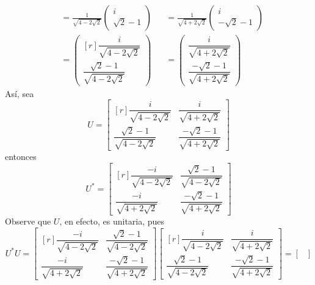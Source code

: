 \begin{example}
\begin{align*}
        & = \frac{1}{\sqrt{4 - 2\sqrt{2}}} \begin{pmatrix} i \\ \sqrt{2} - 1 \end{pmatrix} & & = \frac{1}{\sqrt{4 + 2\sqrt{2}}} \begin{pmatrix} i \\ - \sqrt{2} - 1 \end{pmatrix} \\
        & = \begin{pmatrix*}[r]
            \dfrac{i}{\sqrt{4 - 2\sqrt{2}}} \\[3.5mm]
            \dfrac{\sqrt{2} - 1}{\sqrt{4 - 2\sqrt{2}}}
        \end{pmatrix*} & & = \begin{pmatrix}
            \dfrac{i}{\sqrt{4 + 2\sqrt{2}}} \\[3.5mm]
            \dfrac{- \sqrt{2} - 1}{\sqrt{4 + 2\sqrt{2}}}
        \end{pmatrix}
    \end{align*}
    Así, sea
    $$U = \begin{bmatrix*}[r]
        \dfrac{i}{\sqrt{4 - 2\sqrt{2}}} & \dfrac{i}{\sqrt{4 + 2\sqrt{2}}} \\[3.5mm]
        \dfrac{\sqrt{2} - 1}{\sqrt{4 - 2\sqrt{2}}} & \dfrac{- \sqrt{2} - 1}{\sqrt{4 + 2\sqrt{2}}}
    \end{bmatrix*}$$
    entonces
    $$U^* = \begin{bmatrix*}[r]
        \dfrac{-i}{\sqrt{4 - 2\sqrt{2}}} &  \dfrac{\sqrt{2} - 1}{\sqrt{4 - 2\sqrt{2}}} \\[3.5mm]
        \dfrac{-i}{\sqrt{4 + 2\sqrt{2}}} & \dfrac{- \sqrt{2} - 1}{\sqrt{4 + 2\sqrt{2}}}
    \end{bmatrix*}$$
    Observe que $U$, en efecto, es unitaria, pues
    $$U^*U = \begin{bmatrix*}[r]
        \dfrac{-i}{\sqrt{4 - 2\sqrt{2}}} &  \dfrac{\sqrt{2} - 1}{\sqrt{4 - 2\sqrt{2}}} \\[3.5mm]
        \dfrac{-i}{\sqrt{4 + 2\sqrt{2}}} & \dfrac{- \sqrt{2} - 1}{\sqrt{4 + 2\sqrt{2}}}
    \end{bmatrix*} \begin{bmatrix*}[r]
        \dfrac{i}{\sqrt{4 - 2\sqrt{2}}} & \dfrac{i}{\sqrt{4 + 2\sqrt{2}}} \\[3.5mm]
        \dfrac{\sqrt{2} - 1}{\sqrt{4 - 2\sqrt{2}}} & \dfrac{- \sqrt{2} - 1}{\sqrt{4 + 2\sqrt{2}}}
    \end{bmatrix*} = \begin{bmatrix}

\end{bmatrix}$$
\end{example}
